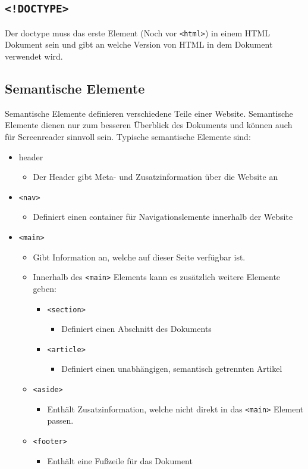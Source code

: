 \documentclass{article}
\begin{document}
	\subsection{\texttt{<!DOCTYPE>}}
	Der doctype muss das erste Element (Noch vor \texttt{<html>}) in einem HTML Dokument sein und gibt an welche Version von HTML in dem Dokument verwendet wird.
	\subsection{Semantische Elemente}
	Semantische Elemente definieren verschiedene Teile einer Website. Semantische Elemente dienen nur zum besseren Überblick des Dokuments und können auch für Screenreader sinnvoll sein. Typische semantische Elemente sind:
	\begin{itemize}
		\item{header}
		\begin{itemize}
			\item{Der Header gibt Meta- und Zusatzinformation über die Website an}
		\end{itemize}
		\item{\texttt{<nav>}}
		\begin{itemize}
			\item{Definiert einen container für Navigationslemente innerhalb der Website}
		\end{itemize}
		\item{\texttt{<main>}}
		\begin{itemize}
			\item{Gibt Information an, welche auf dieser Seite verfügbar ist.}
			\item{Innerhalb des \texttt{<main>} Elements kann es zusätzlich weitere Elemente geben:}
			\begin{itemize}
				\item{\texttt{<section>}}
				\begin{itemize}
					\item{Definiert einen Abschnitt des Dokuments}
				\end{itemize}
				\item{\texttt{<article>}}
				\begin{itemize}
					\item{Definiert einen unabhängigen, semantisch getrennten Artikel}
				\end{itemize}
			\end{itemize}
			\item{\texttt{<aside>}}
			\begin{itemize}
				\item{Enthält Zusatzinformation, welche nicht direkt in das \texttt{<main>} Element passen.}
			\end{itemize}
			\item{\texttt{<footer>}}
			\begin{itemize}
				\item{Enthält eine Fußzeile für das Dokument}
			\end{itemize}
		\end{itemize}
	\end{itemize}
\end{document}
